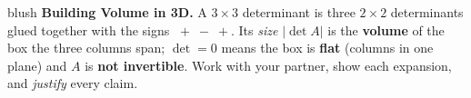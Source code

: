 \documentclass[10pt]{article}
\begin{document}
\namepartnerperiod

\vspace{0.10in}

\begin{headlinebox}{blush}
\small\textbf{Building Volume in 3D.} A $3\times3$ determinant is three $2\times2$ determinants glued
together with the signs $\;{+}\;{-}\;{+}$. Its \emph{size} $|\det A|$ is the \textbf{volume} of the box
the three columns span; $\det=0$ means the box is \textbf{flat} (columns in one plane) and $A$ is
\textbf{not invertible}. Work with your partner, show each expansion, and \emph{justify} every claim.
\end{headlinebox}

\vspace{0.10in}
\end{document}
